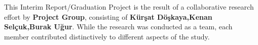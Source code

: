 \label{Individual Contribution Statement} %
\thesisspacing %

%
%
%
%

This Interim Report/Graduation Project is the result of a collaborative research effort by \textbf{Project Group}, consisting of \textbf{Kürşat Döşkaya,Kenan Selçuk,Burak Uğur}. While the research was conducted as a team, each member contributed distinctively to different aspects of the study.

